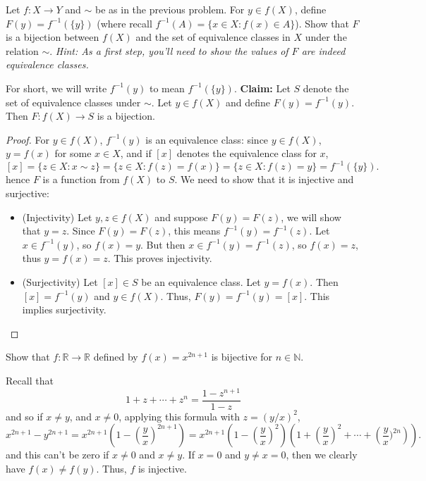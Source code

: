 \documentclass[11pt,dvipsnames]{book}
\numberwithin{figure}{section} %
\numberwithin{table}{section} %
\begin{document}
\begin{exercise}  Let $f:X\rightarrow Y$ and $\sim$ be as in the previous problem.  For $y\in f(X)$, define  $F(y)=f^{-1}(\{y\})$ (where recall $f^{-1}(A)=\{x\in X: f(x)\in A\}$).  Show that $F$ is a bijection between $f(X)$ and the set of equivalence classes in $X$ under the relation $\sim$. {\it Hint:
As a first step, you'll need to show the values of $F$ are indeed equivalence classes. }

\begin{solution}

For short, we will write $f^{-1}(y)$ to mean $f^{-1}(\{y\})$.
{\bf Claim:} Let $S$ denote the set of equivalence classes under $\sim$. Let $y\in f(X)$ and define  $F(y)=f^{-1}(y)$. Then $F:f(X)\rightarrow S$ is a bijection.

\begin{proof}
For $y\in f(X)$, $f^{-1}(y)$ is an equivalence class: since $y\in f(X)$, $y=f(x)$ for some $x\in X$, and if $[x]$ denotes the equivalence class for $x$,
\[
[x]=\{z\in X:x\sim z\} = \{z\in X:f(z)=f(x)\}
= \{z\in X:f(z)=y\}
 =f^{-1}(\{y\}).
 \]
hence $F$ is a function from $f(X)$ to $S$. We need to show that it is injective and surjective:

\begin{itemize}
\item (Injectivity) Let $y,z\in f(X)$ and suppose $F(y)=F(z)$, we will show that $y=z$. Since $F(y)=F(z)$, this means $f^{-1}(y)=f^{-1}(z)$. Let $x\in f^{-1}(y)$, so $f(x)=y$. But then $x\in f^{-1}(y)=f^{-1}(z)$, so $f(x)=z$, thus $y=f(x)=z$. This proves injectivity.
\item (Surjectivity) Let $[x]\in S$ be an equivalence class. Let $y=f(x)$. Then $[x]=f^{-1}(y)$ and $y\in f(X)$. Thus, $F(y)=f^{-1}(y)=[x]$. This implies surjectivity.
\end{itemize}
\end{proof}

\end{solution}
\end{exercise}

\begin{exercise} Show that $f:\mathbb{R}\rightarrow \mathbb{R}$ defined by $f(x)=x^{2n+1}$ is bijective for $n\in\mathbb{N}$.

\begin{solution}
Recall that
\[
1+z+\cdots + z^{n} = \frac{1-z^{n+1}}{1-z}
\]
and so if $x\neq y$, and $x\neq 0$, applying this formula with $z=(y/x)^2$,
\[
x^{2n+1} - y^{2n+1} = x^{2n+1} \left(1-\left(\frac{y}{x}\right)^{2n+1}\right)
= x^{2n+1} \left(1-\left(\frac{y}{x}\right)^2\right)\left(1+\left(\frac{y}{x}\right)^2+\cdots + \left(\frac{y}{x})^{2n}\right)\right).
\]
and this can't be zero if $x\neq 0$ and $x\neq y$. If $x=0$ and $y\neq x=0$, then we clearly have $f(x)\neq f(y)$. Thus, $f$ is injective.
\end{solution}

\end{exercise}
\end{document}

